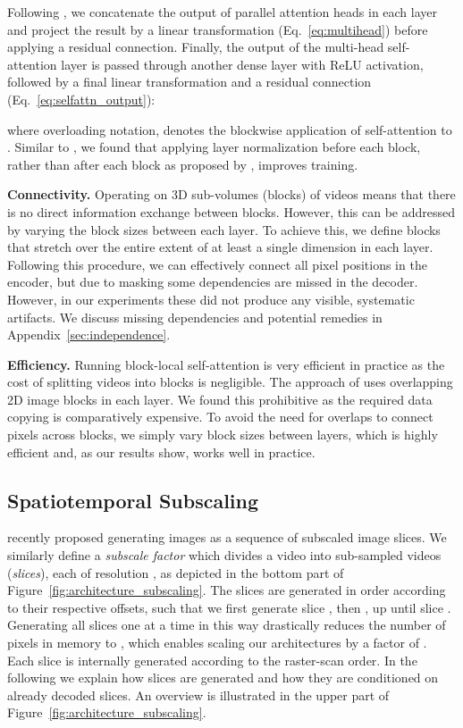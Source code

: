\documentclass{article} \usepackage{iclr2020_conference,times}
\begin{document}
Following \citet{Vaswani2017AttentionIA}, we concatenate the output of  parallel attention heads in each layer and project the result by a linear transformation (Eq.~\ref{eq:multihead}) before applying a residual connection. Finally, the output of the multi-head self-attention layer is passed through another dense layer with ReLU activation, followed by a final linear transformation and a residual connection (Eq.~\ref{eq:selfattn_output}):

where overloading notation,  denotes the blockwise application of self-attention to .
Similar to \citet{Baevski2019Adaptive}, we found that applying layer normalization before each block, rather than after each block as proposed by \citet{Vaswani2017AttentionIA}, improves training.

\textbf{Connectivity.}
Operating on 3D sub-volumes (blocks) of videos means that there is no direct information exchange between blocks. However, this can be addressed by varying the block sizes between each layer. To achieve this, we define blocks that stretch over the entire extent of at least a single dimension in each layer.
Following this procedure, we can effectively connect all pixel positions in the encoder, but due to masking some dependencies are missed in the decoder. However, in our experiments these did not produce any visible, systematic artifacts. We discuss missing dependencies and potential remedies in Appendix~\ref{sec:independence}.





\textbf{Efficiency.}
Running block-local self-attention is very efficient in practice as the cost of splitting videos into blocks is negligible. The approach of \citet{Parmar2018ImageT} uses overlapping 2D image blocks in each layer. We found this prohibitive as the required data copying is comparatively expensive. To avoid the need for overlaps to connect pixels across blocks, we simply vary block sizes between layers, which is highly efficient and, as our results show, works well in practice.


\subsection{Spatiotemporal Subscaling}\label{sec:subscaling}

\citet{Menick2018GeneratingHF} recently proposed generating images as a sequence of subscaled image slices. We similarly define a \textit{subscale factor}  which divides a video into  sub-sampled videos (\emph{slices}), each of resolution , as depicted in the bottom part of Figure~\ref{fig:architecture_subscaling}. The slices are generated in order according to their respective offsets, such that we first generate slice , then , up until slice . Generating all slices one at a time in this way drastically reduces the number of pixels in memory to , which enables scaling our architectures by a factor of . Each slice is internally generated according to the raster-scan order. In the following we explain how slices are generated and how they are conditioned on already decoded slices. An overview is illustrated in the upper part of Figure~\ref{fig:architecture_subscaling}.
\end{document}
